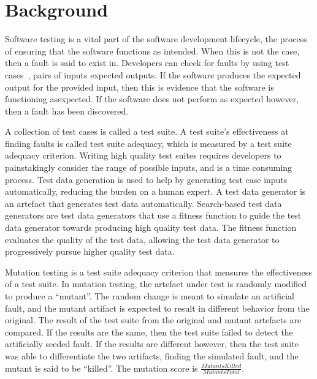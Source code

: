 \section{Background}\label{sec:background}
Software testing is a vital part of the software development lifecycle, the
process of ensuring that the software functions as intended.  When this is not the case, then a fault
is said to exist in. Developers can check for faults by using test cases~\cite{ammann2008}, pairs of inputs 
expected outputs. If the software produces the expected output for the provided input, then this is evidence
that the software is functioning asexpected.  If the software does not perform as expected however, then a
fault has been discovered.

A collection of test cases is called a test suite. A test suite's effectiveness at finding faults is
called test suite adequacy, which is measured by a test suite adequacy criterion.
Writing high quality test suites requires developers to painstakingly consider the
range of possible inputs, and is a time consuming process. Test data generation is used to
help by generating test case inputs automatically, reducing the burden on a human expert. A test data
generator is an artefact that generates test data automatically.
Search-based test data generators are test data generators that use a fitness function to guide the
test data generator towards producing high quality test data. The fitness function evaluates the
quality of the test data, allowing the test data generator to progressively pursue higher quality test 
data.

Mutation testing is a test suite adequacy criterion that measures the effectiveness of a test suite. In
mutation testing, the artefact under test is randomly modified to produce a ``mutant''. The random
change is meant to simulate an artificial fault, and the mutant artifact is expected to result in
different behavior from the original. The result of the test suite from the original and mutant
artefacts are compared. If the results are the same, then the test suite failed to detect the
artificially seeded fault. If the results are different however, then the test suite was able to
differentiate the two artifacts, finding the simulated fault, and the mutant is said to be ``killed''.
The mutation score is $\frac{\mathit{MutantsKilled}}{\mathit{MutantsTotal}}$.



